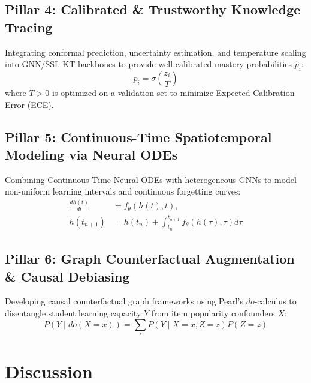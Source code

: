 \documentclass[10pt,journal,compsoc]{IEEEtran}
\begin{document}
\subsection{Pillar 4: Calibrated \& Trustworthy Knowledge Tracing}
Integrating conformal prediction, uncertainty estimation, and temperature scaling into GNN/SSL KT backbones to provide well-calibrated mastery probabilities $\hat{p}_i$:
\begin{equation}
\hat{p}_i = \sigma\left(\frac{z_i}{T}\right)
\end{equation}
where $T > 0$ is optimized on a validation set to minimize Expected Calibration Error (ECE).

\subsection{Pillar 5: Continuous-Time Spatiotemporal Modeling via Neural ODEs}
Combining Continuous-Time Neural ODEs with heterogeneous GNNs to model non-uniform learning intervals and continuous forgetting curves:
\begin{equation}
\begin{split}
\frac{dh(t)}{dt} &= f_\theta(h(t), t), \\
h(t_{n+1}) &= h(t_n) + \int_{t_n}^{t_{n+1}} f_\theta(h(\tau), \tau) d\tau
\end{split}
\end{equation}

\subsection{Pillar 6: Graph Counterfactual Augmentation \& Causal Debiasing}
Developing causal counterfactual graph frameworks using Pearl's $do$-calculus to disentangle student learning capacity $Y$ from item popularity confounders $X$:
\begin{equation}
P(Y \mid do(X = x)) = \sum_{z} P(Y \mid X = x, Z = z) P(Z = z)
\end{equation}

\section{Discussion}
\end{document}
